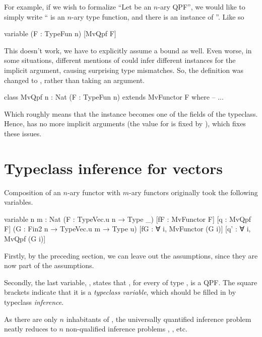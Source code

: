 For example, if we wish to formalize ``Let  be an $n$-ary QPF'', we would like to simply write `` is an $n$-ary type function, and there is an instance of ''. Like so
\begin{leancode}
    variable (F : TypeFun n) [MvQpf F]
\end{leancode}

This doesn't work, we have to explicitly assume a \lean{[MvFunctor F]} bound as well.
Even worse, in some situations, different mentions of  could infer different  instances for the implicit argument, causing surprising type mismatches.
So, the definition was changed to  , rather than taking an argument.
\begin{leancode}
    class MvQpf {n : Nat} (F : TypeFun n) extends MvFunctor F where
        -- ...
\end{leancode}

Which roughly means that the  instance becomes one of the fields of the 
typeclass. Hence,  has no more implicit arguments (the value for  is fixed by ), 
which fixes these issues.


\section{Typeclass inference for vectors}

Composition of an $n$-ary functor  with $m$-ary functors  originally took the following variables.

\begin{leancode}
    variable {n m : Nat} 
             (F : TypeVec.{u} n → Type _) 
             [fF : MvFunctor F] 
             [q : MvQpf F] 
             (G : Fin2 n → TypeVec.{u} m → Type u)
             [fG : ∀ i, MvFunctor (G i)] 
             [q' : ∀ i, MvQpf (G i)]
\end{leancode}

Firstly, by the preceding section, we can leave out the  assumptions, since they are now part of the  assumptions.

Secondly, the last variable, , states that , for every  of type , is a QPF.\@
The square brackets indicate that it is a \emph{typeclass variable}, which should be filled in by typeclass \emph{inference}.

As there are only $n$ inhabitants of , the universally quantified inference problem  neatly reduces to $n$ non-qualified inference problems , , etc.

